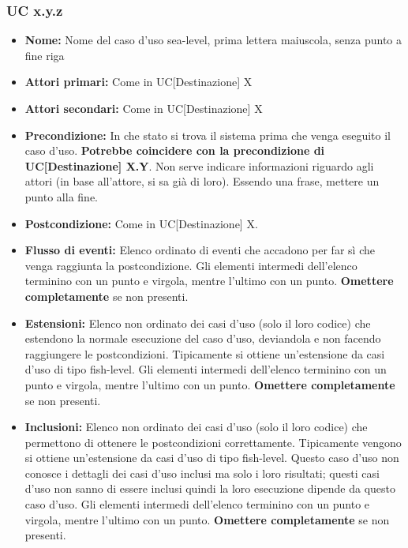 \documentclass[a4paper, oneside]{article} %
\begin{document}
\subsubsection{UC x.y.z}%
\begin{itemize}
	\item \textbf{Nome:} Nome del caso d'uso sea-level, prima lettera maiuscola, senza punto a fine riga
	\item \textbf{Attori primari:} Come in UC[Destinazione] X
	\item \textbf{Attori secondari:} Come in UC[Destinazione] X
	\item \textbf{Precondizione:} In che stato si trova il sistema prima che venga eseguito il caso d'uso. \textbf{Potrebbe coincidere con la precondizione di UC[Destinazione] X.Y}. Non serve indicare informazioni riguardo agli attori (in base all'attore, si sa già di loro). Essendo una frase, mettere un punto alla fine.
	\item \textbf{Postcondizione:} Come in UC[Destinazione] X.
	\item \textbf{Flusso di eventi:} Elenco ordinato di eventi che accadono per far sì che venga raggiunta la postcondizione. Gli elementi intermedi dell'elenco terminino con un punto e virgola, mentre l'ultimo con un punto. \textbf{Omettere completamente} se non presenti.
	\item \textbf{Estensioni:} Elenco non ordinato dei casi d'uso (solo il loro codice) che estendono la normale esecuzione del caso d'uso, deviandola e non facendo raggiungere le postcondizioni. Tipicamente si ottiene un'estensione da casi d'uso di tipo fish-level. Gli elementi intermedi dell'elenco terminino con un punto e virgola, mentre l'ultimo con un punto. \textbf{Omettere completamente} se non presenti.
	\item \textbf{Inclusioni:} Elenco non ordinato dei casi d'uso (solo il loro codice) che permettono di ottenere le postcondizioni correttamente. Tipicamente vengono si ottiene un'estensione da casi d'uso di tipo fish-level. Questo caso d'uso non conosce i dettagli dei casi d'uso inclusi ma solo i loro risultati; questi casi d'uso non sanno di essere inclusi quindi la loro esecuzione dipende da questo caso d'uso. Gli elementi intermedi dell'elenco terminino con un punto e virgola, mentre l'ultimo con un punto.  \textbf{Omettere completamente} se non presenti.
\end{itemize}
\end{document}
